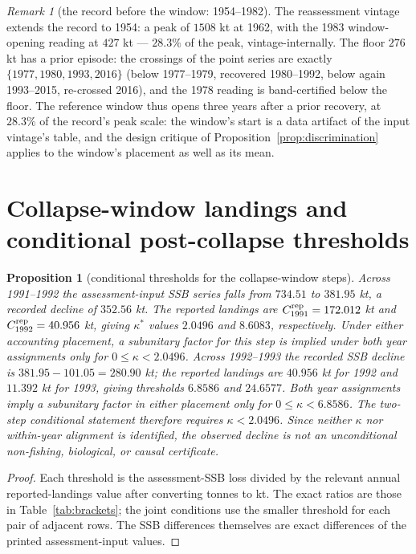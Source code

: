 \documentclass[10pt,twocolumn]{article}
\theoremstyle{plain}
\newtheorem{proposition}[theorem]{Proposition}
\theoremstyle{remark}
\newtheorem{remark}[theorem]{Remark}
\begin{document}
\begin{remark}[the record before the window: 1954--1982]
\label{rem:backward}
The reassessment vintage extends the record to 1954: a peak of
\(1508\) kt at 1962, with the 1983 window-opening reading at
\(427\) kt --- \(28.3\%\) of the peak, vintage-internally. The floor
\(276\) kt has a prior episode: the crossings of the point series are
exactly \(\{1977, 1980, 1993, 2016\}\) (below 1977--1979, recovered
1980--1992, below again 1993--2015, re-crossed 2016), and the 1978
reading is band-certified below the floor. The reference window thus
opens three years after a prior recovery, at \(28.3\%\) of the
record's peak scale: the window's start is a data artifact of the
input vintage's table, and the design critique of
Proposition~\ref{prop:discrimination} applies to the window's
placement as well as its mean.
\end{remark}

\section{Collapse-window landings and conditional post-collapse thresholds}\label{moratorium}

\begin{proposition}[conditional thresholds for the collapse-window steps]
\label{prop:moratorium}
Across 1991--1992 the assessment-input SSB series falls from \(734.51\) to \(381.95\) kt, a recorded decline of \(352.56\) kt. The reported landings are \(C_{1991}^{\rm rep}=172.012\) kt and \(C_{1992}^{\rm rep}=40.956\) kt, giving \(\kappa^*\) values \(2.0496\) and \(8.6083\), respectively. Under either accounting placement, a subunitary factor for this step is implied under both year assignments only for \(0\le\kappa<2.0496\). Across 1992--1993 the recorded SSB decline is \(381.95-101.05=280.90\) kt; the reported landings are \(40.956\) kt for 1992 and \(11.392\) kt for 1993, giving thresholds \(6.8586\) and \(24.6577\). Both year assignments imply a subunitary factor in either placement only for \(0\le\kappa<6.8586\). The two-step conditional statement therefore requires \(\kappa<2.0496\). Since neither \(\kappa\) nor within-year alignment is identified, the observed decline is not an unconditional non-fishing, biological, or causal certificate.
\end{proposition}

\begin{proof}
Each threshold is the assessment-SSB loss divided by the relevant annual reported-landings value after converting tonnes to kt. The exact ratios are those in Table~\ref{tab:brackets}; the joint conditions use the smaller threshold for each pair of adjacent rows. The SSB differences themselves are exact differences of the printed assessment-input values.
\end{proof}
\end{document}
